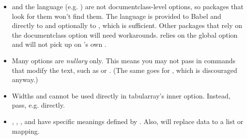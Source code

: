 \begin{BigPages} [hmargin=0.5cm, vmargin=1cm]
\begin{itemize}[long]
    \item {} and the language (e.g. ) are not documentclass-level options,
          so packages that look for them won't find them. The language is provided to Babel
          and directly to  and optionally to , which is sufficient.
          Other packages that rely on the documentclass option will need workarounds.
           relies on the global  option and will not pick up on
          \desert's own .
    \item Many \desert {} options are \textit{nullary} only. This means you may not pass in commands that
          modify the text, such as  or .
          (The same goes for , which is discouraged anyway.)
    \item Widths  and  cannot be used directly in tabularray's inner option.
          Instead, pass, e.g.  directly.
    \item {}, , , and  have specific meanings defined by .
          Also,  will replace data to a list or mapping.
\end{itemize}


\end{BigPages}
